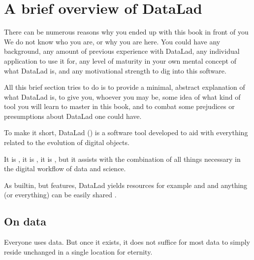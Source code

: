 \chapter{A brief overview of DataLad}
\label{\detokenize{intro/philosophy:a-brief-overview-of-datalad}}\label{\detokenize{intro/philosophy:philo}}\label{\detokenize{intro/philosophy::doc}}

\sphinxAtStartPar
There can be numerous reasons why you ended up with this book in front of
you \textendash{} We do not know who you are, or why you are here.
You could have any background, any amount of previous experience with
DataLad, any individual application to use it for,
any level of maturity in your own mental concept of what DataLad
is, and any motivational strength to dig into this software.

\sphinxAtStartPar
All this brief section tries to do is to provide a minimal, abstract explanation
of what DataLad is, to give you, whoever you may be, some idea of what kind of
tool you will learn to master in this book, and to combat some prejudices
or presumptions about DataLad one could have.

\sphinxAtStartPar
To make it short, DataLad () is a software tool developed to aid with everything
related to the evolution of digital objects.

\sphinxAtStartPar
It is , it is
, it is
,
but it assists with the combination of all things
necessary in the digital workflow of data and science.

\sphinxAtStartPar
As built\sphinxhyphen{}in, but  features, DataLad yields  resources \textendash{} for example
{\hyperref[\detokenize{glossary:term-metadata}]{}} and {\hyperref[\detokenize{glossary:term-provenance}]{}} \textendash{} and anything (or everything)
can be easily shared .


\section{On data}
\label{\detokenize{intro/philosophy:on-data}}
\sphinxAtStartPar
Everyone uses data. But once it exists, it does not suffice for most data
to simply reside unchanged in a single location for eternity.

